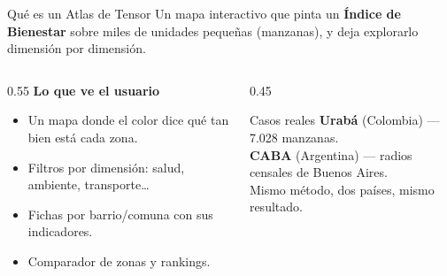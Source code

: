 \documentclass[aspectratio=169,11pt]{beamer}
\newcommand{\lead}[1]{{\color{tPrimary}\large #1}\par\medskip}
\begin{document}
\begin{frame}{Qué es un Atlas de Tensor}
\lead{Un mapa interactivo que pinta un \textbf{Índice de Bienestar} sobre miles de unidades pequeñas (manzanas), y deja explorarlo dimensión por dimensión.}
\begin{columns}[T]
\begin{column}{0.55\textwidth}
\textbf{\color{tPrimary}Lo que ve el usuario}
\begin{itemize}
  \item Un mapa donde el color dice qué tan bien está cada zona.
  \item Filtros por dimensión: salud, ambiente, transporte\dots
  \item Fichas por barrio/comuna con sus indicadores.
  \item Comparador de zonas y rankings.
\end{itemize}
\end{column}
\begin{column}{0.45\textwidth}
\begin{block}{Casos reales}
\textbf{Urabá} (Colombia) — 7.028 manzanas.\\[3pt]
\textbf{CABA} (Argentina) — radios censales de Buenos Aires.\\[6pt]
\footnotesize Mismo método, dos países, mismo resultado.
\end{block}
\end{column}
\end{columns}
\end{frame}
\end{document}
